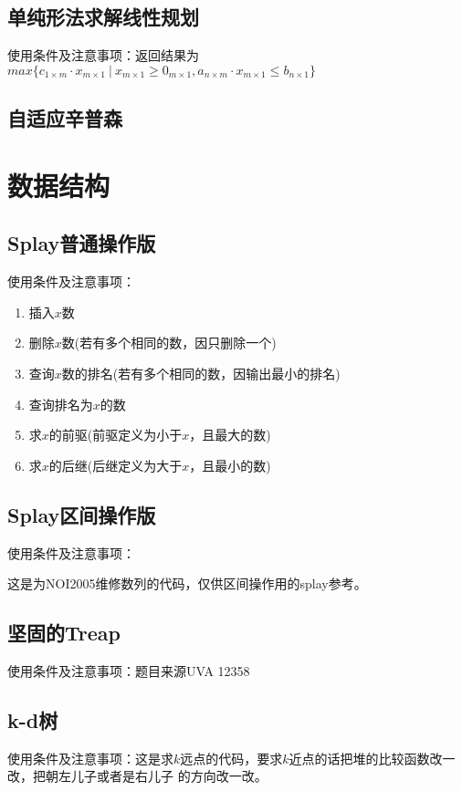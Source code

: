 \documentclass[openany, a4paper, 10pt]{book}
\begin{document}
\begin{spacing}{1.0}
		\section{单纯形法求解线性规划}
			使用条件及注意事项：返回结果为$max\{c_{1 \times m} \cdot x_{m \times 1} \ | \ x_{m \times 1} \geq 0_{m \times 1}, a_{n \times m} \cdot x_{m \times 1} \leq b_{n \times 1}\}$
			
		\section{自适应辛普森}
			
	\chapter{数据结构}
		\section{Splay普通操作版}
			使用条件及注意事项：\par
			\begin{enumerate}
				\item 插入$x$数
				\item 删除$x$数(若有多个相同的数，因只删除一个)
				\item 查询$x$数的排名(若有多个相同的数，因输出最小的排名)
				\item 查询排名为$x$的数
				\item 求$x$的前驱(前驱定义为小于$x$，且最大的数)
				\item 求$x$的后继(后继定义为大于$x$，且最小的数)
			\end{enumerate}
			
		\section{Splay区间操作版}
			使用条件及注意事项：\par
			这是为NOI2005维修数列的代码，仅供区间操作用的splay参考。
			
		\section{坚固的Treap}
			使用条件及注意事项：题目来源UVA 12358
			
		\section{k-d树}
			使用条件及注意事项：这是求$k$远点的代码，要求$k$近点的话把堆的比较函数改一改，把朝左儿子或者是右儿子
			的方向改一改。
			

\end{spacing}
\end{document}
